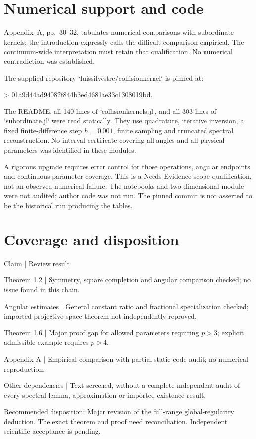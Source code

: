 \documentclass[10pt]{article}
\begin{document}
\section*{Numerical support and code}
Appendix A, pp. 30–32, tabulates numerical comparisons with subordinate kernels; the introduction expressly calls the difficult comparison empirical. The continuum-wide interpretation must retain that qualification. No numerical contradiction was established.\par
The supplied repository `luissilvestre/collisionkernel` is pinned at:\par
> 01a9d44ad94082f844b3ed4681ae33c1308019bd.\par
The README, all 140 lines of `collisionkernels.jl`, and all 303 lines of `subordinate.jl` were read statically. They use quadrature, iterative inversion, a fixed finite-difference step \(h=0.001\), finite sampling and truncated spectral reconstruction. No interval certificate covering all angles and all physical parameters was identified in these modules.\par
A rigorous upgrade requires error control for those operations, angular endpoints and continuous parameter coverage. This is a Needs Evidence scope qualification, not an observed numerical failure. The notebooks and two-dimensional module were not audited; author code was not run. The pinned commit is not asserted to be the historical run producing the tables.\par
\section*{Coverage and disposition}
Claim | Review result\par
Theorem 1.2 | Symmetry, square completion and angular comparison checked; no issue found in this chain.\par
Angular estimates | General constant ratio and fractional specialization checked; imported projective-space theorem not independently reproved.\par
Theorem 1.6 | Major proof gap for allowed parameters requiring \(p>3\); explicit admissible example requires \(p>4\).\par
Appendix A | Empirical comparison with partial static code audit; no numerical reproduction.\par
Other dependencies | Text screened, without a complete independent audit of every spectral lemma, approximation or imported existence result.\par
Recommended disposition: Major revision of the full-range global-regularity deduction. The exact theorem and proof need reconciliation. Independent scientific acceptance is pending.\par
\end{document}
